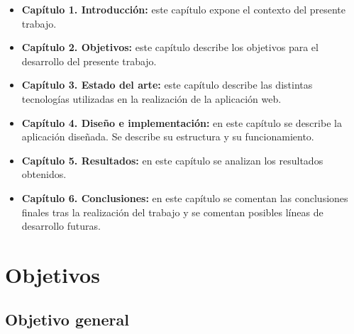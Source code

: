 \documentclass[a4paper, 12pt]{book}
\begin{document}
\begin{itemize}
        \item \textbf{Capítulo 1. Introducción:} este capítulo expone el contexto del presente trabajo.
        \item \textbf{Capítulo 2. Objetivos:} este capítulo describe los objetivos para el desarrollo del presente trabajo.
        \item \textbf{Capítulo 3. Estado del arte:} este capítulo describe las distintas tecnologías utilizadas en la realización de la aplicación web.
        \item \textbf{Capítulo 4. Diseño e implementación:} en este capítulo se describe la aplicación diseñada. Se describe su estructura y su funcionamiento.
        \item \textbf{Capítulo 5. Resultados:} en este capítulo se analizan los resultados obtenidos.
        \item \textbf{Capítulo 6. Conclusiones:} en este capítulo se comentan las conclusiones finales tras la realización del trabajo y se comentan posibles líneas de desarrollo futuras.
\end{itemize}




%



\cleardoublepage
\chapter{Objetivos}
\label{chap:objetivos}

\section{Objetivo general}
\label{sec:objetivo-general}
\end{document}
